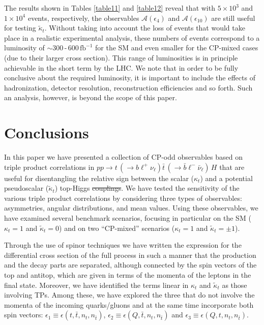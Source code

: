 \documentclass[aps,preprint,tightenlines,floatfix,superscriptaddress,nofootinbib,showpacs]{revtex4-1}
\def\tbar{\bar{t}}
\def\bbar{\bar{b}}
\def\nubar{{\bar{\nu}}_{\ell}}
\def\ppprocess{pp\to t\,\left(\rightarrow b {\ell}^+ \nu_{\ell}\right) \tbar\,\left(\rightarrow\bbar {\ell}^-\nubar\right)\,H}
\def\kp{\kappa_t}
\def\kpt{\tilde{\kappa}_t}
\def\TPa{\epsilon(t,\tbar,n_t,n_{\tbar})}
\def\TPb{\epsilon(Q,\tbar,n_t,n_{\tbar})}
\def\TPc{\epsilon(Q,t,n_t,n_{\tbar})}
\providecommand{\DIFadd}[1]{{\protect\color{blue}\uwave{#1}}} %
\providecommand{\DIFdel}[1]{{\protect\color{red}\sout{#1}}}                      %
\providecommand{\DIFaddbegin}{} %
\providecommand{\DIFaddend}{} %
\providecommand{\DIFdelbegin}{} %
\providecommand{\DIFdelend}{} %
\begin{document}
The
results shown in Tables \ref{table11} and \ref{table12} reveal that
with $5\times 10^3$ and $1\times 10^4$ events, respectively, the
observables $\mathcal{A}(\epsilon_4)$ and $\mathcal{A}(\epsilon_{10})$
are still useful for testing $\kpt$. Without taking into account
the loss of events that would take place in a realistic 
experimental analysis, these numbers of events
correspond to a luminosity of $\sim
300\,$-$\,600\,\mathrm{fb}^{-1}$ for the SM and even smaller for the
$\mathrm{CP}$-mixed cases (due to their larger cross section). This range
of luminosities is in principle achievable in the short term by the
LHC. We note that in order to be fully conclusive about the required
luminosity, it is important to include the effects of hadronization,
detector resolution, reconstruction efficiencies and so
forth. Such an analysis, however, is beyond the scope of this
paper.
%
\section{Conclusions}
\label{sec7}
%
In this paper we have presented a collection of $\mathrm{CP}$-odd
observables based on triple product correlations
in $\ppprocess$ that are useful for
disentangling the relative sign between the scalar ($\kp$) and a
potential pseudoscalar ($\kpt$) top-Higgs \DIFdelbegin \DIFdel{couplings}\DIFdelend \DIFaddbegin \DIFadd{coupling}\DIFaddend .
We have tested the
sensitivity of the various triple product correlations
by considering three types of
observables: asymmetries, angular distributions, and mean values.
Using these observables, we have examined several benchmark
scenarios, focusing in particular on the SM ($\kp=1$ and $\kpt=0$)
and on two ``$\mathrm{CP}$-mixed'' scenarios ($\kp=1$ and $\kpt=\pm1$).
\par

Through the use of spinor techniques we have written the expression
for the differential cross section of the full process in such a
manner that the production and the decay parts are separated, although
connected by the spin vectors of the top and antitop, which are given
in terms of the momenta of the leptons in the final state. Moreover,
we have identified the terms linear in $\kp$ and $\kpt$ as those
involving TPs. Among these, we have explored the three that do not
involve the momenta of the incoming quarks/gluons and at the same time
incorporate both spin vectors: $\epsilon_1\equiv \TPa$,
$\epsilon_2\equiv \TPb$ and $\epsilon_3\equiv \TPc$.\par
\end{document}
